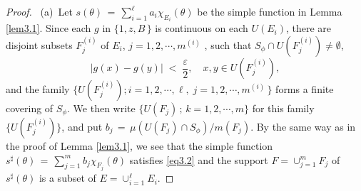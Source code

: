 \documentclass[12pt]{amsart}
\theoremstyle{plain}
\numberwithin{equation}{section}
\begin{document}
\begin{proof}\,
{\rm (a)}\, Let $s(\theta)\,=\, \sum_{i=1}^{\ell} a_i \chi_{E_i}(\theta)$
be the simple function in Lemma \ref{lem3.1}. Since each $g$ in
$\{1, z, B \,\}$ is continuous on each $U(E_i)$,
there are disjoint subsets $F^{(i)}_j$ of $E_i$,
$j=1, 2, \cdots, m^{(i)}$ , such that
$S_\phi \cap U(F^{(i)}_j)\neq\emptyset$,
$$
\left\vert g(x) - g(y) \right\vert\; <\;\frac{\varepsilon}{2},
\quad x,y \in U(F^{(i)}_j),
$$
and the family $\{U(F^{(i)}_j) ; i=1,2,\cdots, \ell,\; j=1, 2,
\cdots, m^{(i)} \, \}$ forms a finite covering of $S_\phi$.
We then write $\{U(F_j)\,; \, k=1,2,\cdots, m \}$ for this family
$\{U(F_j^{(i)})\}$,
and put $b_j\,=\, \mu(U(F_j)\cap S_\phi)/m(F_j)$. By the same way
as in the proof of Lemma \ref{lem3.1}, we see that the simple function
$s^\sharp(\theta) \,=\, \sum_{j=1}^{m} b_j \chi_{F_j}(\theta)$ satisfies \eqref{eq3.2}
and the support $F=\cup_{j=1}^m F_j$ of $s^\sharp(\theta)$ is a
subset of $E=\cup_{i=1}^{\ell} E_i$.


\end{proof}
\end{document}
